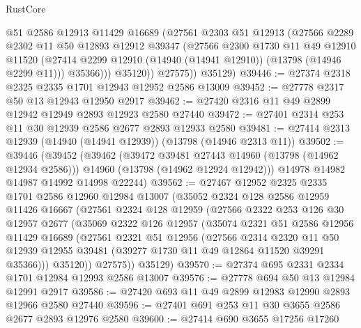 \begin{lexlean}{RustCore}
\begin{coremodule}
              @51
              @2586
              @12913
              @11429
              @16689
              (@27561
                @2303
                @51
                @12913
                (@27566
                  @2289
                  @2302
                  @11
                  @50
                  @12893
                  @12912
                  @39347
                  (@27566
                    @2300
                    @1730
                    @11
                    @49
                    @12910
                    @11520
                    (@27414 @2299 @12910 (@14940 (@14941 @12910)) (@13798 (@14946 @2299 @11)))
                    @35366)))
              @35120))
          @27575))
      @35129)
@39446 := @27374 @2318 @2325 @2335 @1701 @12943 @12952 @2586 @13009
@39452 := @27778 @2317 @50 @13 @12943 @12950 @2917
@39462 := @27420 @2316 @11 @49 @2899 @12942 @12949 @2893 @12923 @2580 @27440
@39472 := @27401 @2314 @253 @11 @30 @12939 @2586 @2677 @2893 @12933 @2580
@39481 := @27414 @2313 @12939 (@14940 (@14941 @12939)) (@13798 (@14946 @2313 @11))
@39502 := @39446
    (@39452
      (@39462
        (@39472 @39481 @27443 @14960 (@13798 (@14962 @12934 @2586)))
        @14960
        (@13798 (@14962 @12924 @12942)))
      @14978
      @14982
      @14987
      @14992
      @14998
      @22244)
@39562 := @27467
    @12952
    @2325
    @2335
    @1701
    @2586
    @12960
    @12984
    @13007
    (@35052
      @2324
      @128
      @2586
      @12959
      @11426
      @16667
      (@27561
        @2324
        @128
        @12959
        (@27566
          @2322
          @253
          @126
          @30
          @12957
          @2677
          (@35069
            @2322
            @126
            @12957
            (@35074
              @2321
              @51
              @2586
              @12956
              @11429
              @16689
              (@27561
                @2321
                @51
                @12956
                (@27566
                  @2314
                  @2320
                  @11
                  @50
                  @12939
                  @12955
                  @39481
                  (@39277 @1730 @11 @49 @12864 @11520 @39291 @35366)))
              @35120))
          @27575))
      @35129)
@39570 := @27374 @695 @2331 @2334 @1701 @12984 @12993 @2586 @13007
@39576 := @27778 @694 @50 @13 @12984 @12991 @2917
@39586 := @27420 @693 @11 @49 @2899 @12983 @12990 @2893 @12966 @2580 @27440
@39596 := @27401 @691 @253 @11 @30 @3655 @2586 @2677 @2893 @12976 @2580
@39600 := @27414 @690 @3655 @17256 @17260

\end{coremodule}
\end{lexlean}
